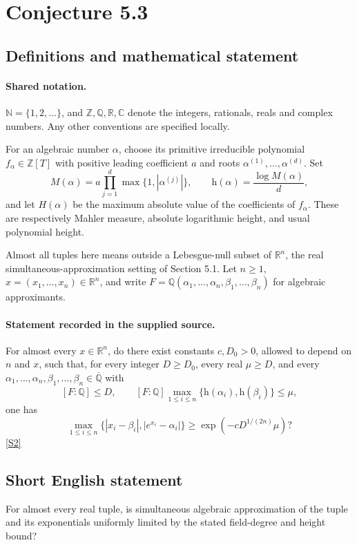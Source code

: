 \documentclass[11pt]{article}
\newcommand{\sref}[2]{\hyperlink{source:#1:#2}{[S#2]}}
\begin{document}
\section{Conjecture 5.3}\label{statement}

\subsection{Definitions and mathematical statement}

\paragraph{Shared notation.}$\mathbb N=\{1,2,\ldots\}$, and $\mathbb Z,\mathbb Q,\mathbb R,\mathbb C$ denote the integers, rationals, reals and complex numbers. Any other conventions are specified locally.


For an algebraic number $\alpha$, choose its primitive irreducible polynomial $f_\alpha\in\mathbb Z[T]$ with positive leading coefficient $a$ and roots $\alpha^{(1)},\ldots,\alpha^{(d)}$. Set
\[
 M(\alpha)=a\prod_{j=1}^d\max\{1,|\alpha^{(j)}|\},\qquad
 \mathrm h(\alpha)=\frac{\log M(\alpha)}d,
\]
and let $H(\alpha)$ be the maximum absolute value of the coefficients of $f_\alpha$. These are respectively Mahler measure, absolute logarithmic height, and usual polynomial height.

Almost all tuples here means outside a Lebesgue-null subset of $\mathbb R^n$, the real simultaneous-approximation setting of Section 5.1. Let $n\ge1$, $x=(x_1,\ldots,x_n)\in\mathbb R^n$, and write $F=\mathbb Q(\alpha_1,\ldots,\alpha_n,\beta_1,\ldots,\beta_n)$ for algebraic approximants.
\paragraph{Statement recorded in the supplied source.}
For almost every $x\in\mathbb R^n$, do there exist constants $c,D_0>0$, allowed to depend on $n$ and $x$, such that, for every integer $D\ge D_0$, every real $\mu\ge D$, and every $\alpha_1,\ldots,\alpha_n,\beta_1,\ldots,\beta_n\in\overline{\mathbb Q}$ with
\[
[F:\mathbb Q]\le D,\qquad [F:\mathbb Q]\max_{1\le i\le n}\{\mathrm h(\alpha_i),\mathrm h(\beta_i)\}\le\mu,
\]
one has
\[
\max_{1\le i\le n}\{|x_i-\beta_i|,|e^{x_i}-\alpha_i|\}\ge\exp(-cD^{1/(2n)}\mu)?
\] \sref{statement}{2}

\subsection{Short English statement}
For almost every real tuple, is simultaneous algebraic approximation of the tuple and its exponentials uniformly limited by the stated field-degree and height bound?
\end{document}
